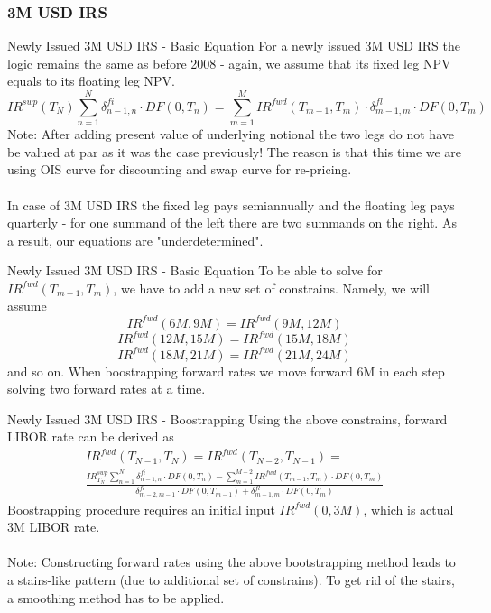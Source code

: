 \documentclass{beamer}
\begin{document}
\subsubsection{3M USD IRS}

\begin{frame}{Newly Issued 3M USD IRS - Basic Equation}
For a newly issued 3M USD IRS the logic remains the same as before 2008 - again, we assume that its fixed leg NPV equals to its floating leg NPV.
\begin{equation*}
IR^{swp}(T_N) \sum_{n = 1} ^ N \delta_{n - 1, n}^{fi} \cdot DF(0, T_n) = \sum_{m = 1} ^ M IR^{fwd}(T_{m-1}, T_m) \cdot \delta_{m - 1, m}^{fl} \cdot DF(0, T_m)
\end{equation*}
Note: After adding present value of underlying notional the two legs do not have be valued at par as it was the case previously! The reason is that this time we are using OIS curve for discounting and swap curve for re-pricing.
\\~\\
In case of 3M USD IRS the fixed leg pays semiannually and the floating leg pays quarterly - for one summand of the left there are two summands on the right. As a result, our equations are "underdetermined".
\end{frame}

\begin{frame}{Newly Issued 3M USD IRS - Basic Equation}
To be able to solve for $IR^{fwd}(T_{m-1}, T_m)$, we have to add a new set of constrains. Namely, we will assume
\begin{equation*}
IR^{fwd}(6M, 9M) = IR^{fwd}(9M, 12M)
\end{equation*}
\begin{equation*}
IR^{fwd}(12M, 15M) = IR^{fwd}(15M, 18M)
\end{equation*}
\begin{equation*}
IR^{fwd}(18M, 21M) = IR^{fwd}(21M, 24M)
\end{equation*}
and so on. When boostrapping forward rates we move forward 6M in each step solving two forward rates at a time.
\end{frame}

\begin{frame}{Newly Issued 3M USD IRS - Boostrapping}
Using the above constrains, forward LIBOR rate can be derived as
\begin{multline*}
IR^{fwd}(T_{N - 1}, T_N) = IR^{fwd}(T_{N - 2}, T_{N - 1}) =\\
\frac{IR^{swp}_{T_N} \sum_{n = 1} ^ N \delta_{n - 1, n}^{fi} \cdot DF(0, T_n) - \sum_{m = 1} ^ {M - 2} IR^{fwd}(T_{m-1}, T_m) \cdot DF(0, T_m)}{\delta_{m - 2, m - 1}^{fl} \cdot DF(0, T_{m - 1}) + \delta_{m - 1, m}^{fl} \cdot DF(0, T_m)}
\end{multline*}
Boostrapping procedure requires an initial input $IR^{fwd}(0, 3M)$, which is actual 3M LIBOR rate.
\\~\\
Note: Constructing forward rates using the above bootstrapping method leads to a stairs-like pattern (due to additional set of constrains). To get rid of the stairs, a smoothing method has to be applied.
\end{frame}
\end{document}
